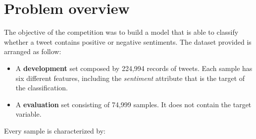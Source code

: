 \documentclass[conference]{IEEEtran}
\begin{document}
\section{Problem overview}\label{sec:overview}
The objective of the competition was to build a model that is able to classify whether a tweet contains positive or negative sentiments. The dataset provided is arranged as follow:
\begin{itemize}
    \item A \textbf{development} set composed by 224,994 records of tweets. Each sample has six different features, including the \textit{sentiment} attribute that is the target of the classification.
    \item A \textbf{evaluation} set consisting of 74,999 samples. It does not contain the target variable.
\end{itemize}
Every sample is characterized by:
\end{document}
